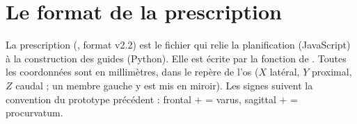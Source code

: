 \chapter{Le format de la prescription}
\label{ann:prescription}

\begin{chapeau}
La prescription (, format v2.2) est le fichier qui relie la planification (JavaScript) à la
construction des guides (Python). Elle est écrite par la fonction  de .
Toutes les coordonnées sont en millimètres, dans le repère de l'os ($X$ latéral, $Y$ proximal, $Z$ caudal ; un membre
gauche y est mis en miroir). Les signes suivent la convention du prototype précédent : frontal $+$ = varus, sagittal
$+$ = procurvatum.
\end{chapeau}

